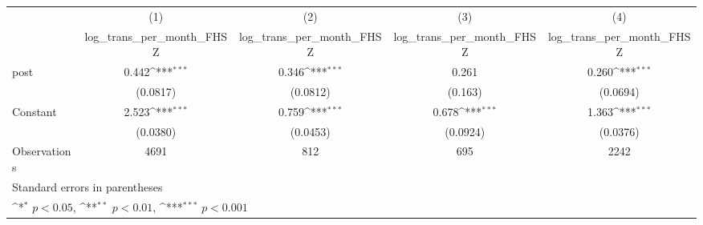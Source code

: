 {
\def\sym#1{\ifmmode^{#1}\else\(^{#1}\)\fi}
\begin{tabular}{l*{4}{c}}
\hline\hline
                    &\multicolumn{1}{c}{(1)}&\multicolumn{1}{c}{(2)}&\multicolumn{1}{c}{(3)}&\multicolumn{1}{c}{(4)}\\
                    &\multicolumn{1}{c}{log\_trans\_per\_month\_FHSZ}&\multicolumn{1}{c}{log\_trans\_per\_month\_FHSZ}&\multicolumn{1}{c}{log\_trans\_per\_month\_FHSZ}&\multicolumn{1}{c}{log\_trans\_per\_month\_FHSZ}\\
\hline
post                &       0.442\sym{***}&       0.346\sym{***}&       0.261         &       0.260\sym{***}\\
                    &    (0.0817)         &    (0.0812)         &     (0.163)         &    (0.0694)         \\
[1em]
Constant            &       2.523\sym{***}&       0.759\sym{***}&       0.678\sym{***}&       1.363\sym{***}\\
                    &    (0.0380)         &    (0.0453)         &    (0.0924)         &    (0.0376)         \\
\hline
Observations        &        4691         &         812         &         695         &        2242         \\
\hline\hline
\multicolumn{5}{l}{\footnotesize Standard errors in parentheses}\\
\multicolumn{5}{l}{\footnotesize \sym{*} \(p<0.05\), \sym{**} \(p<0.01\), \sym{***} \(p<0.001\)}\\
\end{tabular}
}
